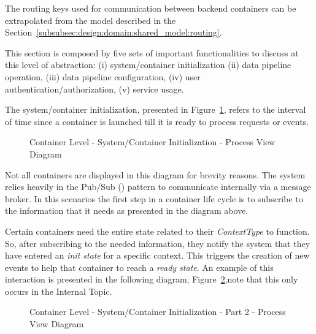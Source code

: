 The routing keys used for communication between backend containers can be extrapolated from the model described in the Section~\ref{subsubsec:design:domain:shared_model:routing}. 

This section is composed by five sets of important functionalities to discuss at this level of abstraction: (i) system/container initialization (ii) data pipeline operation, (iii) data pipeline configuration, (iv) user authentication/authorization, (v) service usage.

The system/container initialization, presented in Figure~\ref{fig:design:architecture:container:process:diagram:init}, refers to the interval of time since a container is launched till it is ready to process requests or events.

\begin{figure}[H]
   \centering
   \resizebox{\columnwidth}{!}
   {      
      
   }
   \caption[Container Level - System/Container Initialization - Process View Diagram]{Container Level - System/Container Initialization - Process View Diagram}
   \label{fig:design:architecture:container:process:diagram:init}
\end{figure}

Not all containers are displayed in this diagram for brevity reasons.
The system relies heavily in the Pub/Sub (\cite{pubsub}) pattern to communicate internally via a message broker. In this scenarios the first step in a container life cycle is to subscribe to the information that it needs as presented in the diagram above.

Certain containers need the entire state related to their \textit{ContextType} to function. So, after subscribing to the needed information, they notify the system that they have entered an \textit{init state} for a specific context. This triggers the creation of new events to help that container to reach a \textit{ready state}. An example of this interaction is presented in the following diagram, Figure~\ref{fig:design:architecture:container:process:diagram:ready},note that this only occurs in the Internal Topic.

\begin{figure}[H]
   \centering
   \resizebox{\columnwidth}{!}
   {      
      
   }
   \caption[Container Level - System/Container Initialization - Part 2 - Process View Diagram]{Container Level - System/Container Initialization - Part 2 - Process View Diagram}
   \label{fig:design:architecture:container:process:diagram:ready}
\end{figure}

